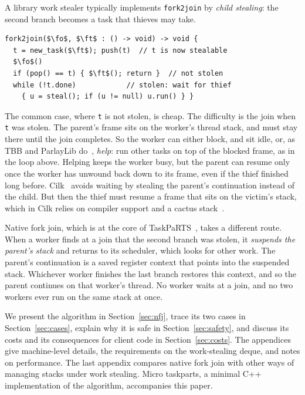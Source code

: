 \documentclass[sigplan,nonacm]{acmart}
\newcommand{\fo}{\mathtt{f_1}}
\newcommand{\ft}{\mathtt{f_2}}
\begin{document}
A library work stealer typically implements \lstinline|fork2join| by
\emph{child stealing}: the second branch becomes a task that thieves
may take.
%
\begin{lstlisting}
fork2join($\fo$, $\ft$ : () -> void) -> void {
  t = new_task($\ft$); push(t)  // t is now stealable
  $\fo$()
  if (pop() == t) { $\ft$(); return }  // not stolen
  while (!t.done)            // stolen: wait for thief
    { u = steal(); if (u != null) u.run() } }
\end{lstlisting}
%
The common case, where \lstinline|t| is not stolen, is cheap.
%
The difficulty is the join when \lstinline|t| was stolen.
%
The parent's frame sits on the worker's thread stack, and must stay
there until the join completes.
%
So the worker can either block, and sit idle, or, as TBB and
ParlayLib do~\cite{threadingbuildingblocksmanual,blelloch20parlaylib},
\emph{help}: run other tasks on top of the blocked frame, as in the
loop above.
%
Helping keeps the worker busy, but the parent can resume only once the
worker has unwound back down to its frame, even if the thief finished
long before.
%
Cilk~\cite{frigo98cilk5,schardl2017tapir} avoids waiting by stealing
the parent's continuation instead of the child.
%
But then the thief must resume a frame that sits on the victim's
stack, which in Cilk relies on compiler support and a cactus
stack~\cite{lee2010cilk-m}.

Native fork join, which is at the core of
TaskPaRTS~\cite{taskparts}, takes a different route.
%
When a worker finds at a join that the second branch was stolen, it
\emph{suspends the parent's stack} and returns to its scheduler, which
looks for other work.
%
The parent's continuation is a saved register context that points
into the suspended stack.
%
Whichever worker finishes the last branch restores this context, and
so the parent continues on that worker's thread.
%
No worker waits at a join, and no two workers ever run on the same
stack at once.

We present the algorithm in Section~\ref{sec:nfj}, trace its two cases
in Section~\ref{sec:cases}, explain why it is safe in
Section~\ref{sec:safety}, and discuss its costs and its consequences
for client code in Section~\ref{sec:costs}.
%
The appendices give machine-level details, the requirements on the
work-stealing deque, and notes on performance.
%
The last appendix compares native fork join with other ways of
managing stacks under work stealing.
%
Micro taskparts, a minimal C++ implementation of the algorithm,
accompanies this paper.
\end{document}

